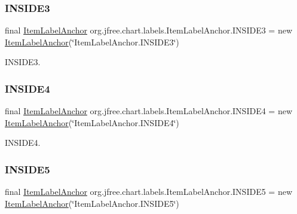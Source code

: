 \subsubsection{\texorpdfstring{I\+N\+S\+I\+D\+E3}{INSIDE3}}
{\footnotesize\ttfamily final \mbox{\hyperlink{classorg_1_1jfree_1_1chart_1_1labels_1_1_item_label_anchor}{Item\+Label\+Anchor}} org.\+jfree.\+chart.\+labels.\+Item\+Label\+Anchor.\+I\+N\+S\+I\+D\+E3 = new \mbox{\hyperlink{classorg_1_1jfree_1_1chart_1_1labels_1_1_item_label_anchor}{Item\+Label\+Anchor}}(\char`\"{}Item\+Label\+Anchor.\+I\+N\+S\+I\+D\+E3\char`\"{})\hspace{0.3cm}{\ttfamily [static]}}

I\+N\+S\+I\+D\+E3. \mbox{\label{classorg_1_1jfree_1_1chart_1_1labels_1_1_item_label_anchor_a75c102db9c794f2f8009386d51ce7879}} 
\subsubsection{\texorpdfstring{I\+N\+S\+I\+D\+E4}{INSIDE4}}
{\footnotesize\ttfamily final \mbox{\hyperlink{classorg_1_1jfree_1_1chart_1_1labels_1_1_item_label_anchor}{Item\+Label\+Anchor}} org.\+jfree.\+chart.\+labels.\+Item\+Label\+Anchor.\+I\+N\+S\+I\+D\+E4 = new \mbox{\hyperlink{classorg_1_1jfree_1_1chart_1_1labels_1_1_item_label_anchor}{Item\+Label\+Anchor}}(\char`\"{}Item\+Label\+Anchor.\+I\+N\+S\+I\+D\+E4\char`\"{})\hspace{0.3cm}{\ttfamily [static]}}

I\+N\+S\+I\+D\+E4. \mbox{\label{classorg_1_1jfree_1_1chart_1_1labels_1_1_item_label_anchor_a54b1d2863567fed45c4bd9c5412d6be4}} 
\subsubsection{\texorpdfstring{I\+N\+S\+I\+D\+E5}{INSIDE5}}
{\footnotesize\ttfamily final \mbox{\hyperlink{classorg_1_1jfree_1_1chart_1_1labels_1_1_item_label_anchor}{Item\+Label\+Anchor}} org.\+jfree.\+chart.\+labels.\+Item\+Label\+Anchor.\+I\+N\+S\+I\+D\+E5 = new \mbox{\hyperlink{classorg_1_1jfree_1_1chart_1_1labels_1_1_item_label_anchor}{Item\+Label\+Anchor}}(\char`\"{}Item\+Label\+Anchor.\+I\+N\+S\+I\+D\+E5\char`\"{})\hspace{0.3cm}{\ttfamily [static]}}

